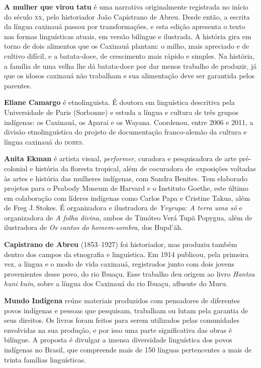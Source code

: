 
\textbf{A mulher que virou tatu} é uma narrativa originalmente registrada no início do século \textsc{xx}, pelo historiador João Capistrano de Abreu. Desde então, a escrita da língua caxinauá passou por transformações, e esta edição apresenta o texto nas formas linguísticas atuais, em versão bilíngue e ilustrada. A história gira em torno de dois alimentos que os Caxinauá plantam: o milho, mais apreciado e de cultivo difícil, e a batata-doce, de crescimento mais rápido e simples. Na história, a família de uma velha lhe dá batata-doce por dar menos trabalho de produzir, já que os idosos caxinauá não trabalham e sua alimentação deve ser garantida pelos parentes.

\textbf{Eliane Camargo} é etnolinguista. É doutora em linguística descritiva pela Universidade de Paris (Sorbonne) e estuda a língua e cultura de três grupos indígenas: os Caxinauá, os Aparai e os Wayana. Coordenou, entre 2006 e 2011, a divisão etnolinguística do projeto de documentação franco-alemão da cultura e língua caxinauá do \textsc{dobes}.

\textbf{Anita Ekman} é artista visual, \textit{performer}, curadora e pesquisadora de arte pré-colonial e história da floresta tropical, além de cocuradora de~exposições voltadas às artes e história das mulheres indígenas, com Sandra Benites. Tem elaborado projetos para o Peabody Museum de Harvard e o Instituto Goethe, este último em colaboração com líderes indígenas como Carlos Papa e Cristine Takua, além de Freg J.\,Stokes. É organizadora e ilustradora de \textit{Yvyrupa: A terra uma só} e organizadora de \textit{A folha divina}, ambos de Timóteo Verá Tupã Popygua, além de ilustradora de \textit{Os cantos do homem-sombra}, dos Hupd'äh.

\textbf{Capistrano de Abreu} (1853--1927) foi historiador, mas produziu também dentro dos campos da etnografia e linguística. Em 1914 publicou, pela primeira vez, a língua e o modo de vida caxinauá, registrados junto com dois jovens provenientes desse povo, do rio Ibuaçu. Esse trabalho deu origem ao livro \textit{Hantxa huni kuin}, sobre a língua dos Caxinauá do rio Ibuaçu, afluente do Muru.

\textbf{Mundo Indígena} reúne materiais produzidos com pensadores de diferentes povos indígenas e pessoas que pesquisam, trabalham ou lutam pela garantia de seus direitos. Os livros foram feitos para serem utilizados pelas comunidades envolvidas na sua produção, e por isso uma parte significativa das obras é bilíngue. A proposta é divulgar a imensa diversidade linguística dos povos indígenas no Brasil, que compreende mais de 150 línguas pertencentes a mais de trinta famílias linguísticas.


